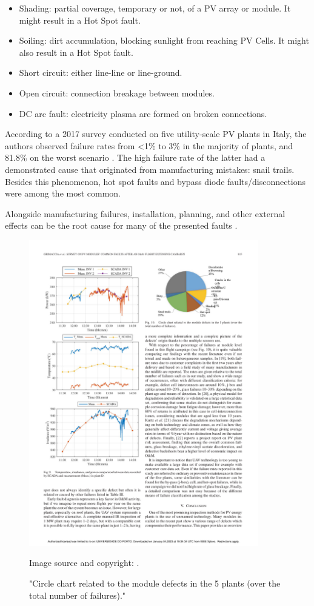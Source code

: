 \begin{itemize}
    \item Shading: partial coverage, temporary or not, of a PV array or module. It might result in a Hot Spot fault.
    \item Soiling: dirt accumulation, blocking sunlight from reaching PV Cells. It might also result in a Hot Spot fault.
    \item Short circuit: either line-line or line-ground.
    \item Open circuit: connection breakage between modules.
    \item DC arc fault: electricity plasma arc formed on broken connections.
\end{itemize}

According to a 2017 survey conducted on five utility-scale PV plants in Italy, the authors observed failure rates from
<1\% to 3\% in the majority of plants, and 81.8\% on the worst scenario \cite{Grimaccia2017}. The high failure rate of
the latter had a demonstrated cause that originated from manufacturing mistakes: snail trails. Besides this phenomenon,
hot spot faults and bypass diode faults/disconnections were among the most common.

Alongside manufacturing failures, installation, planning, and other external effects can be the root cause for many of the presented faults \cite{sunny}.

\begin{figure}[h]
    \centering
    \includegraphics[width=10cm, trim={11cm 20.6cm 2.4cm 2cm},
    clip]{figures/chapter2/chartfailsurvey.pdf} \caption{"Circle chart related to the module defects in the 5 plants
    (over the total number of failures)."} Image source and copyright: \cite{Grimaccia2017}.
    \label{fig:faultchart}
\end{figure}

